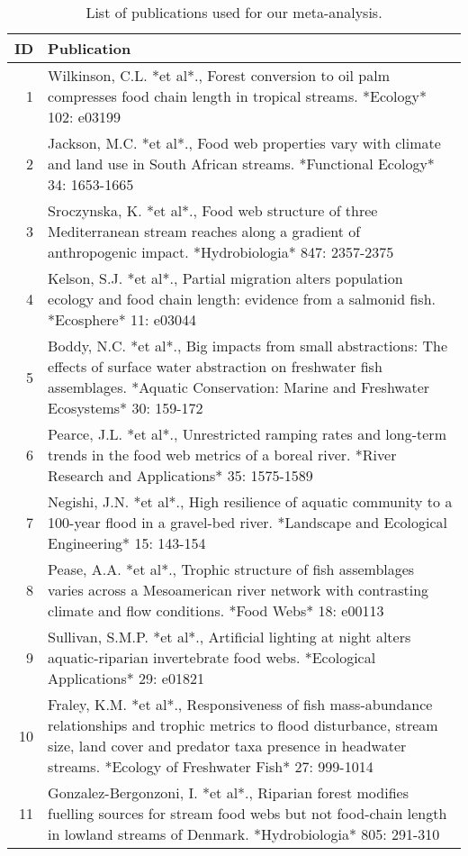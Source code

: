 \begin{table}[ht]
\centering
\caption{List of publications used for our meta-analysis.
             \label{tab:meta-list}} 
\begingroup\small
\begin{tabularx}{\textwidth}{rl}
  \hline
ID & Publication \\ 
  \hline
  1 & Wilkinson, C.L. *et al*., Forest conversion to oil palm compresses food chain length in tropical streams. *Ecology* 102: e03199 \\ 
    2 & Jackson, M.C. *et al*., Food web properties vary with climate and land use in South African streams. *Functional Ecology* 34: 1653-1665 \\ 
    3 & Sroczynska, K. *et al*., Food web structure of three Mediterranean stream reaches along a gradient of anthropogenic impact. *Hydrobiologia* 847: 2357-2375 \\ 
    4 & Kelson, S.J. *et al*., Partial migration alters population ecology and food chain length: evidence from a salmonid fish. *Ecosphere* 11: e03044 \\ 
    5 & Boddy, N.C. *et al*., Big impacts from small abstractions: The effects of surface water abstraction on freshwater fish assemblages. *Aquatic Conservation: Marine and Freshwater Ecosystems* 30: 159-172 \\ 
    6 & Pearce, J.L. *et al*., Unrestricted ramping rates and long-term trends in the food web metrics of a boreal river. *River Research and Applications* 35: 1575-1589 \\ 
    7 & Negishi, J.N. *et al*., High resilience of aquatic community to a 100-year flood in a gravel-bed river. *Landscape and Ecological Engineering* 15: 143-154 \\ 
    8 & Pease, A.A. *et al*., Trophic structure of fish assemblages varies across a Mesoamerican river network with contrasting climate and flow conditions. *Food Webs* 18: e00113 \\ 
    9 & Sullivan, S.M.P. *et al*., Artificial lighting at night alters aquatic-riparian invertebrate food webs. *Ecological Applications* 29: e01821 \\ 
   10 & Fraley, K.M. *et al*., Responsiveness of fish mass-abundance relationships and trophic metrics to flood disturbance, stream size, land cover and predator taxa presence in headwater streams. *Ecology of Freshwater Fish* 27: 999-1014 \\ 
   11 & Gonzalez-Bergonzoni, I. *et al*., Riparian forest modifies fuelling sources for stream food webs but not food-chain length in lowland streams of Denmark. *Hydrobiologia* 805: 291-310 \\ 

\end{tabularx}
\end{table}
